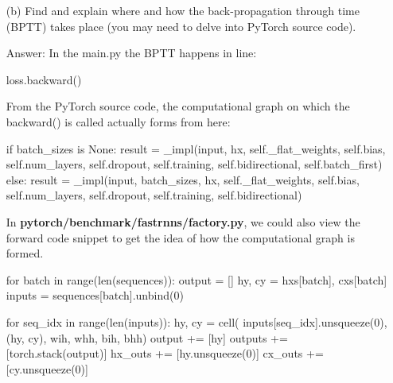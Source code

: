 \documentclass[12pt,letterpaper]{article}
\begin{document}
\begin{itemize}
    
    \item[(b)]Find and explain where and how the back-propagation through time (BPTT) takes place (you may need to delve into PyTorch source code).
    
    Answer: In the main.py the BPTT happens in line:
    \begin{python}
        loss.backward()
    \end{python}
    
    From the PyTorch source code, the computational graph on which the backward() is called actually forms from here:
    \begin{python}
    if batch_sizes is None:
        result = _impl(input, hx, self._flat_weights, self.bias, self.num_layers,
         self.dropout, self.training, self.bidirectional, self.batch_first)
    else:
        result = _impl(input, batch_sizes, hx, self._flat_weights, self.bias,
         self.num_layers, self.dropout, self.training, self.bidirectional)
    \end{python}
    
    In \textbf{pytorch/benchmark/fastrnns/factory.py}, we could also view the forward code snippet to get the idea of how the computational graph is formed.
    \begin{python}
        for batch in range(len(sequences)):
            output = []
            hy, cy = hxs[batch], cxs[batch]
            inputs = sequences[batch].unbind(0)

            for seq_idx in range(len(inputs)):
                hy, cy = cell(
                    inputs[seq_idx].unsqueeze(0), (hy, cy), wih, whh, bih, bhh)
                output += [hy]
            outputs += [torch.stack(output)]
            hx_outs += [hy.unsqueeze(0)]
            cx_outs += [cy.unsqueeze(0)]


\end{python}
\end{itemize}
\end{document}
